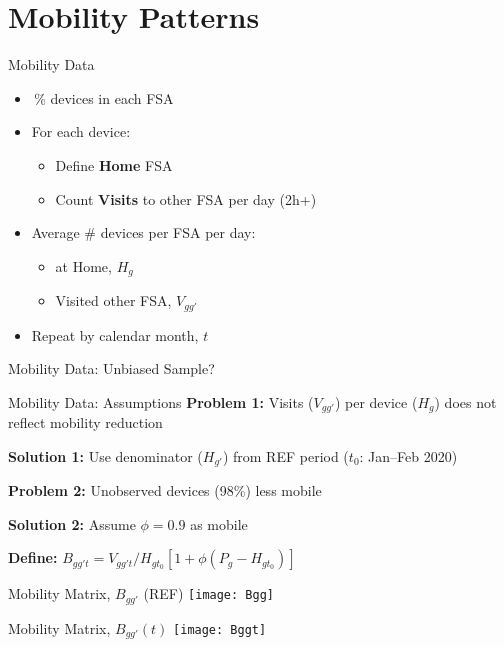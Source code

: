 \section{Mobility Patterns}
\begin{frame}{Mobility Data}
  \begin{itemize}
    \item {}\,\% devices in each FSA
    \item For each device:
    \begin{itemize}
      \item Define \textbf{Home} FSA
      \item Count \textbf{Visits} to other FSA per day (2h+)
    \end{itemize}
    \item Average \# devices per FSA per day:
    \begin{itemize}
      \item at Home, $H_{g}$
      \item Visited other FSA, $V_{gg'}$
    \end{itemize}
    \item Repeat by calendar month, $t$
  \end{itemize}
\end{frame}
\begin{frame}{Mobility Data: Unbiased Sample?}
\end{frame}
\begin{frame}{Mobility Data: Assumptions}
  \textbf{Problem 1:} Visits ($V_{gg'}$) per device ($H_{g}$) does not reflect mobility reduction
  \par\medskip
  \textbf{Solution 1:} Use denominator ($H_{g'}$) from REF period ($t_0$: Jan--Feb 2020)
  \par\bigskip\bigskip
  \textbf{Problem 2:} Unobserved devices (98\%) less mobile
  \par\medskip
  \textbf{Solution 2:} Assume $\phi = 0.9$ as mobile
  \par\bigskip\bigskip
  \textbf{Define:} $B_{gg't} = V_{gg't} / H_{gt_0} \left[1 + \phi \left(P_{g} - H_{gt_0} \right)\right]$
\end{frame}
\begin{frame}{Mobility Matrix, $B_{gg'}$ (REF)}
  \centering\texttt{[image: Bgg]}
\end{frame}
\begin{frame}{Mobility Matrix, $B_{gg'}(t)$}
  \centering\texttt{[image: Bggt]}
\end{frame}
